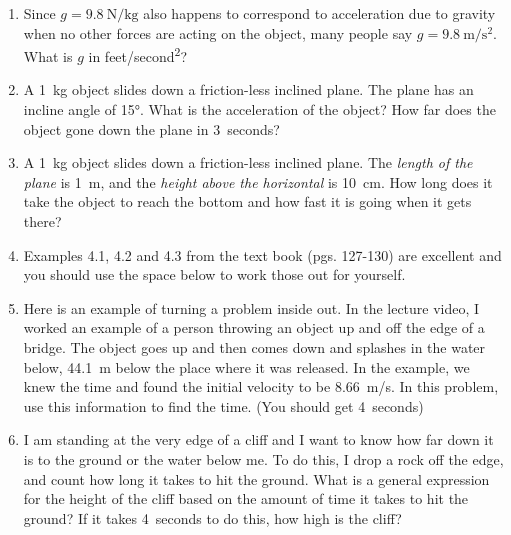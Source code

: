 \begin{enumerate}
\item Since $g=\SI{9.8}{\newton/\kilogram}$ also happens to correspond to acceleration due to gravity when no other forces are acting on the object, many people say $g=\SI{9.8}{\meter/\second^2}$. What is $g$ in \si{feet/second^2}?

\item A \SI{1}{kg} object slides down a friction-less inclined plane. The plane has an incline angle of \ang{15}. What is the acceleration of the object? How far does the object gone down the plane in \SI{3}{seconds}?\bigskip

\item A \SI{1}{kg} object slides down a friction-less inclined plane. The \emph{length of the plane} is \SI{1}{\meter}, and the \emph{height above the horizontal} is \SI{10}{\centi\meter}. How long does it take the object to reach the bottom and how fast it is going when it gets there?\bigskip

\clearpage
\item Examples 4.1, 4.2 and 4.3 from the text book (pgs. 127-130) are excellent and you should use the space below to work those out for yourself.
\clearpage

\item Here is an example of turning a problem inside out. In the lecture video, I worked an example of a person throwing an object up and off the edge of a bridge. The object goes up and then comes down and splashes in the water below, \SI{44.1}{\meter} below the place where it was released. In the example, we knew the time and found the initial velocity to be \SI{+8.66}{\meter / \second}. In this problem, use this information to find the time. (You should get \SI{4}{seconds})

\item I am standing at the very edge of a cliff and I want to know how far down it is to the ground or the water below me. To do this, I drop a rock off the edge, and count how long it takes to hit the ground. What is a general expression for the height of the cliff based on the amount of time it takes to hit the ground? If it takes \SI{4}{seconds} to do this, how high is the cliff? 


\end{enumerate}
